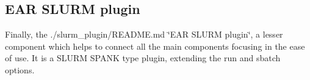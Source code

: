 \subsection*{E\+AR S\+L\+U\+RM plugin}

Finally, the ./slurm\+\_\+plugin/\+R\+E\+A\+D\+ME.md \char`\"{}\+E\+A\+R S\+L\+U\+R\+M plugin\char`\"{}, a lesser component which helps to connect all the main components focusing in the ease of use. It is a S\+L\+U\+RM S\+P\+A\+NK type plugin, extending the {\ttfamily run} and {\ttfamily sbatch} options. 